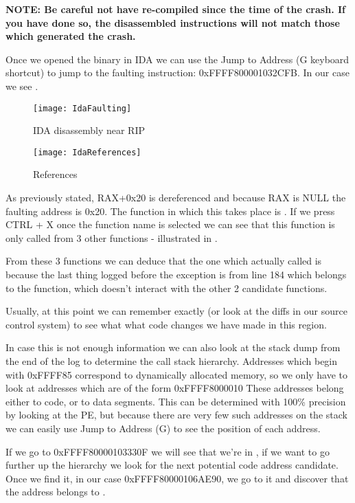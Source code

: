 \begin{appendices}
\textbf{NOTE: Be careful not have re-compiled \projectname since the time of the crash.
If you have done so, the disassembled instructions will not match those which generated the crash.}

Once we opened the binary in IDA we can use the Jump to Address (G keyboard shortcut) to jump to the 
faulting instruction: 0xFFFF800001032CFB. In our case we see .

\begin{figure}
	\centering
	\texttt{[image: IdaFaulting]}
		\caption{IDA disassembly near RIP}
	\label{fig:IdaFault}
\end{figure}

\begin{figure}
	\centering
	\texttt{[image: IdaReferences]}
		\caption{ References}
	\label{fig:IdaRefs}
\end{figure}

As previously stated, RAX+0x20 is dereferenced and because RAX is NULL the faulting address is 0x20.
The function in which this takes place is . If we press CTRL + X once the
function name is selected we can see that this function is only called from 3 other functions -
illustrated in .

From these 3 functions we can deduce that the one which actually called  is
 because the last thing logged before the exception is from
 line 184 which belongs to the  function,
which doesn't interact with the other 2 candidate functions.

Usually, at this point we can remember exactly (or look at the diffs in our source control system)
to see what what code changes we have made in this region.

In case this is not enough information we can also look at the stack dump from the end of the log to
determine the call stack hierarchy. Addresses which begin with 0xFFFF85 correspond to dynamically
allocated memory, so we only have to look at addresses which are of the form 0xFFFF8000010 These
addresses belong either to code, or to data segments. This can be determined with 100\% precision
by looking at the PE, but because there are very few such addresses on the stack we can easily use
Jump to Address (G) to see the position of each address.

If we go to  0xFFFF80000103330F we will see that we're in , if we
want to go further up the hierarchy we look for the next potential code address candidate. Once we
find it, in our case 0xFFFF80000106AE90, we go to it and discover that the address belongs to
.


\end{appendices}
